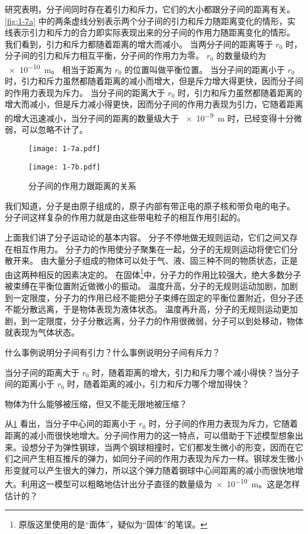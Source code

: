 研究表明，分子间同时存在着引力和斥力，它们的大小都跟分子间的距离有关。
\cref{fig:1-7a} 中的两条虚线分别表示两个分子间的引力和斥力随距离变化的情形，实线表示引力和斥力的合力即实际表现出来的分子间的作用力随距离变化的情形。
我们看到，引力和斥力都随着距离的增大而减小。
当两分子间的距离等于 $r_0$ 时，分子间的引力和斥力相互平衡，分子间的作用力为零。
$r_0$ 的数量级约为 \qty{e-10}{m}。
相当于距离为 $r_0$ 的位置叫做平衡位置。
当分子间的距离小于 $r_0$ 时，引力和斥力虽然都随着距离的减小而增大，但是斥力增大得更快，因而分子间的作用力表现为斥力。
当分子间的距离大于 $r_0$ 时，引力和斥力虽然都随着距离的增大而减小，但是斥力减小得更快，因而分子间的作用力表现为引力，它随着距离的增大迅速减小，当分子间的距离的数量级大于 \qty{e-9}{m} 时，已经变得十分微弱，可以忽略不计了。
\begin{figure}
  \begin{minipage}[b]{0.5\linewidth}\centering
    \texttt{[image: 1-7a.pdf]}
    \subcaption{}\label{fig:1-7a}
  \end{minipage}
  \begin{minipage}[b]{0.45\linewidth}\centering
    \texttt{[image: 1-7b.pdf]}
    \subcaption{}\label{fig:1-7b}
  \end{minipage}
	\caption{分子间的作用力跟距离的关系}\label{fig:1-7}
\end{figure}

我们知道，分子是由原子组成的，原子内部有带正电的原子核和带负电的电子。
分子间这样复杂的作用力就是由这些带电粒子的相互作用引起的。

上面我们讲了分子运动论的基本内容。
分子不停地做无规则运动，它们之间又存在相互作用力。
分子力的作用使分子聚集在一起，分子的无规则运动将使它们分散开来。
由大量分子组成的物体可以处于气、液、固三种不同的物质状态，正是由这两种相反的因素决定的。
在固体\footnote{原版这里使用的是“面体”，疑似为“固体”的笔误。}中，分子力的作用比较强大，绝大多数分子被束缚在平衡位置附近做微小的振动。
温度升高，分子的无规则运动加剧，加剧到一定限度，分子力的作用已经不能把分子束缚在固定的平衡位置附近，但分子还不能分散远离，于是物体表现为液体状态。
温度再升高，分子的无规则运动更加剧，到一定限度，分子分散远离，分子力的作用很微弱，分子可以到处移动，物体就表现为气体状态。

\begin{Practice}
\begin{question}
	\item 什么事例说明分子间有引力？什么事例说明分子间有斥力？
	\item 当分子间的距离大于 $r_0$ 时，随着距离的增大，引力和斥力哪个减小得快？当分子间的距离小于 $r_0$ 时，随着距离的减小，引力和斥力哪个增加得快？
	\item 物体为什么能够被压缩，但又不能无限地被压缩？
  \item	从\cref{fig:1-7} 看出，当分子中心间的距离小于 $r_0$ 时，分子间的作用力表现为斥力，它随着距离的减小而很快地增大。分子间作用力的这一特点，可以借助于下述模型想象出来。设想分子为弹性钢球，当两个钢球相撞时，它们都发生微小的形变，因而在它们之间产生相互推斥的弹力，如同分子间的作用力表现为斥力一样。钢球发生微小形变就可以产生很大的弹力，所以这个弹力随着钢球中心间距离的减小而很快地增大。利用这一模型可以粗略地估计出分子直径的数量级为\qty{e-10}{m}。这是怎样估计的？
\end{question}
\end{Practice}

